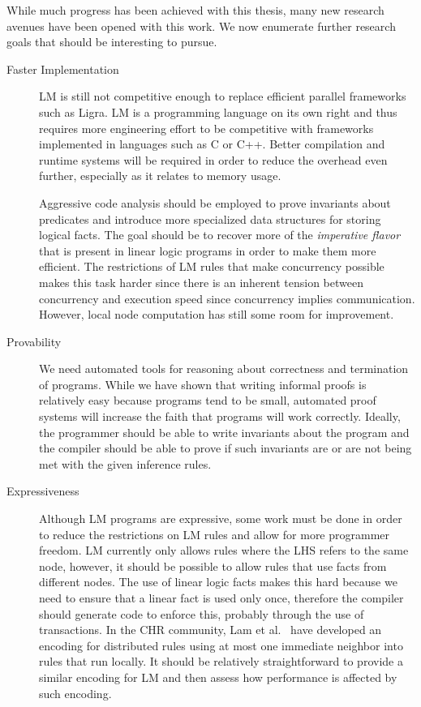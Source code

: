 While much progress has been achieved with this thesis, many new research
avenues have been opened with this work. We now enumerate further research goals
that should be interesting to pursue.

\begin{description}
   \item[Faster Implementation]

LM is still not competitive enough to replace efficient parallel frameworks such
as Ligra. LM is a programming language on its own right and thus requires more
engineering effort to be competitive with frameworks implemented in languages
such as C or C++. Better compilation and runtime systems will be required in
order to reduce the overhead even further, especially as it relates to memory
usage.

Aggressive code analysis should be employed to prove invariants about predicates
and introduce more specialized data structures for storing logical facts. The
goal should be to recover more of the \emph{imperative flavor} that is present
in linear logic programs in order to make them more efficient. The restrictions
of LM rules that make concurrency possible makes this task harder since there is
an inherent tension between concurrency and execution speed since concurrency
implies communication. However, local node computation has still some room for
improvement.

\item[Provability]

We need automated tools for reasoning about correctness and termination of
programs. While we have shown that writing informal proofs is relatively easy
because programs tend to be small, automated proof systems will increase the
faith that programs will work correctly. Ideally, the programmer should be able
to write invariants about the program and the compiler should be able to prove
if such invariants are or are not being met with the given inference rules.

\item[Expressiveness]

Although LM programs are expressive, some work must be done in order to reduce
the restrictions on LM rules and allow for more programmer freedom.  LM
currently only allows rules where the LHS refers to the same node, however, it
should be possible to allow rules that use facts from different nodes. The use
of linear logic facts makes this hard because we need to ensure that a linear
fact is used only once, therefore the compiler should generate code to enforce
this, probably through the use of transactions. In the CHR community, Lam et
al.~\cite{Lam:2013:DEC:2505879.2505892} have developed an encoding for
distributed rules using at most one immediate neighbor into rules that run
locally. It should be relatively straightforward to provide a similar encoding
for LM and then assess how performance is affected by such encoding.


\end{description}
